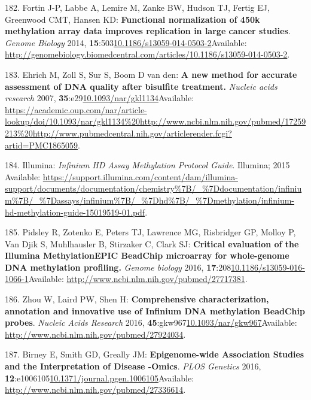\documentclass[
]{book}
\begin{document}
\leavevmode\hypertarget{ref-Fortin2014}{}%
182. Fortin J-P, Labbe A, Lemire M, Zanke BW, Hudson TJ, Fertig EJ, Greenwood CMT, Hansen KD: \textbf{Functional normalization of 450k methylation array data improves replication in large cancer studies}. \emph{Genome Biology} 2014, \textbf{15}:503\href{https://doi.org/10.1186/s13059-014-0503-2}{10.1186/s13059-014-0503-2}Available: \url{http://genomebiology.biomedcentral.com/articles/10.1186/s13059-014-0503-2}.

\leavevmode\hypertarget{ref-Ehrich2007}{}%
183. Ehrich M, Zoll S, Sur S, Boom D van den: \textbf{A new method for accurate assessment of DNA quality after bisulfite treatment.} \emph{Nucleic acids research} 2007, \textbf{35}:e29\href{https://doi.org/10.1093/nar/gkl1134}{10.1093/nar/gkl1134}Available: \url{https://academic.oup.com/nar/article-lookup/doi/10.1093/nar/gkl1134\%20http://www.ncbi.nlm.nih.gov/pubmed/17259213\%20http://www.pubmedcentral.nih.gov/articlerender.fcgi?artid=PMC1865059}.

\leavevmode\hypertarget{ref-Illumina2015}{}%
184. Illumina: \emph{Infinium HD Assay Methylation Protocol Guide}. Illumina; 2015 Available: \url{https://support.illumina.com/content/dam/illumina-support/documents/documentation/chemistry\%7B/_\%7Ddocumentation/infinium\%7B/_\%7Dassays/infinium\%7B/_\%7Dhd\%7B/_\%7Dmethylation/infinium-hd-methylation-guide-15019519-01.pdf}.

\leavevmode\hypertarget{ref-Pidsley2016}{}%
185. Pidsley R, Zotenko E, Peters TJ, Lawrence MG, Risbridger GP, Molloy P, Van Djik S, Muhlhausler B, Stirzaker C, Clark SJ: \textbf{Critical evaluation of the Illumina MethylationEPIC BeadChip microarray for whole-genome DNA methylation profiling.} \emph{Genome biology} 2016, \textbf{17}:208\href{https://doi.org/10.1186/s13059-016-1066-1}{10.1186/s13059-016-1066-1}Available: \url{http://www.ncbi.nlm.nih.gov/pubmed/27717381}.

\leavevmode\hypertarget{ref-Zhou2017}{}%
186. Zhou W, Laird PW, Shen H: \textbf{Comprehensive characterization, annotation and innovative use of Infinium DNA methylation BeadChip probes}. \emph{Nucleic Acids Research} 2016, \textbf{45}:gkw967\href{https://doi.org/10.1093/nar/gkw967}{10.1093/nar/gkw967}Available: \url{http://www.ncbi.nlm.nih.gov/pubmed/27924034}.

\leavevmode\hypertarget{ref-Birney2016}{}%
187. Birney E, Smith GD, Greally JM: \textbf{Epigenome-wide Association Studies and the Interpretation of Disease -Omics}. \emph{PLOS Genetics} 2016, \textbf{12}:e1006105\href{https://doi.org/10.1371/journal.pgen.1006105}{10.1371/journal.pgen.1006105}Available: \url{http://www.ncbi.nlm.nih.gov/pubmed/27336614}.
\end{document}

